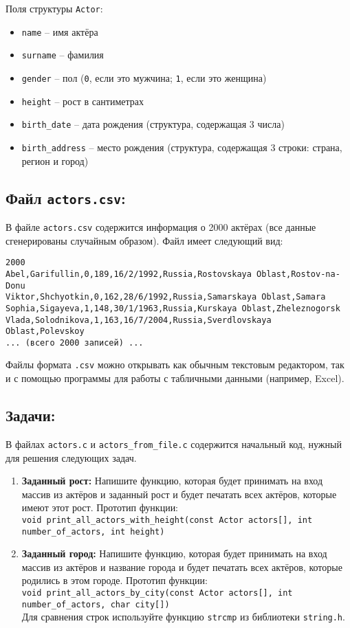 \documentclass{article}
\begin{document}
Поля структуры \texttt{Actor}:
\begin{itemize}
\item \texttt{name} -- имя актёра
\item \texttt{surname} -- фамилия
\item \texttt{gender} -- пол (\texttt{0}, если это мужчина; \texttt{1}, если это женщина)
\item \texttt{height} -- рост в сантиметрах
\item \texttt{birth\_date} -- дата рождения (структура, содержащая 3 числа)
\item \texttt{birth\_address} -- место рождения (структура, содержащая 3 строки: страна, регион и город)
\end{itemize}


\subsection*{Файл \texttt{actors.csv}:}
В файле \texttt{actors.csv} содержится информация о 2000 актёрах (все данные сгенерированы случайным образом). Файл имеет следующий вид:
\begin{verbatim}
2000
Abel,Garifullin,0,189,16/2/1992,Russia,Rostovskaya Oblast,Rostov-na-Donu
Viktor,Shchyotkin,0,162,28/6/1992,Russia,Samarskaya Oblast,Samara
Sophia,Sigayeva,1,148,30/1/1963,Russia,Kurskaya Oblast,Zheleznogorsk
Vlada,Solodnikova,1,163,16/7/2004,Russia,Sverdlovskaya Oblast,Polevskoy
... (всего 2000 записей) ...
\end{verbatim}
Файлы формата \texttt{.csv} можно открывать как обычным текстовым редактором, так и с помощью программы для работы с табличными данными (например, Excel). 

\subsection*{Задачи:}
В файлах \texttt{actors.c} и \texttt{actors\_from\_file.c} содержится начальный код, нужный для решения следующих задач.
\begin{enumerate}
\item \textbf{Заданный рост:} Напишите функцию, которая будет принимать на вход массив из актёров и заданный рост и будет печатать всех актёров, которые имеют этот рост. Прототип функции:\\
\texttt{void print\_all\_actors\_with\_height(const Actor actors[], int number\_of\_actors, int height)}
\item \textbf{Заданный город:} Напишите функцию, которая будет принимать на вход массив из актёров и название города и будет печатать всех актёров, которые родились в этом городе. Прототип функции:\\
\texttt{void print\_all\_actors\_by\_city(const Actor actors[], int number\_of\_actors, char city[])}\\
Для сравнения строк используйте функцию \texttt{strcmp} из библиотеки \texttt{string.h}.
\end{enumerate}
\end{document}
